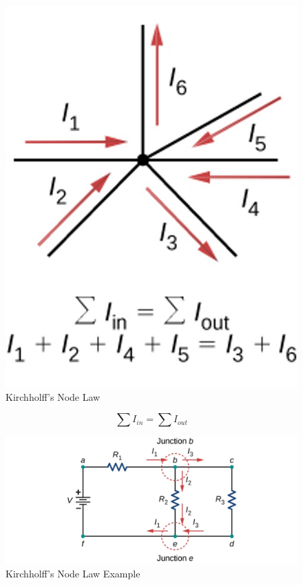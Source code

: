\documentclass[14pt]{memoir}
\begin{document}
\begin{figure}[H]
\begin{center}
\includegraphics[scale=0.50]{fig/fig_10_20.jpg}
\caption{Kirchholff's Node Law}
\label{fig:10_20}
\end{center}
\end{figure}

\begin{equation}
\sum I_{in} = \sum I_{out}
\end{equation}

\begin{figure}[H]
\begin{center}
\includegraphics[scale=0.50]{fig/fig_10_24.jpg}
\caption{Kirchholff's Node Law Example}
\label{fig:10_24}
\end{center}
\end{figure}
\end{document}
